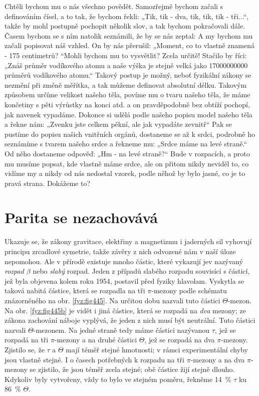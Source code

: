     Chtěli bychom mu o nás všechno povědět. Samozřejmě bychom začali s deﬁnováním čísel, a to tak,
    že bychom řekli: „Tik, tik - dva, tik, tik, tik - tři...“, takže by mohl postupně pochopit
    několik slov, a tak bychom pokračovali dále. Časem bychom se s ním natolik seznámili, že by se
    nás zeptal:  A my bychom mu začali popisovat náš vzhled.  On by nás přerušil: „Moment, co to vlastně znamená - 175 centimetrů?
    “Mohli bychom mu to vysvětlit? Zcela určitě! Stačilo by říci: „Znáš průměr vodíkového atomu a
    naše výška je stejně velká jako \num{17 000 000 000} průměrů vodíkového atomu.“ Takový postup je
    možný, neboť fyzikální zákony se nezmění při změně měřítka, a tak můžeme deﬁnovat absolutní
    délku. Takovým způsobem určíme velikost našeho těla, povíme mu o tvaru našeho těla, že máme
    končetiny s pěti výrůstky na konci atd. a on pravděpodobně bez obtíží pochopí, jak navenek
    vypadáme. Dokonce si udělá podle našeho popisu model našeho těla a řekne nám: „Zvenku jste
    celkem pěkní, ale jak vypadáte zevnitř“ Pak se pustíme do popisu našich vnitřních orgánů,
    dostaneme se až k srdci, podrobně ho seznámíme s tvarem našeho srdce a řekneme mu: „Srdce máme
    na levé straně.“ Od něho dostaneme odpověď: „Hm - na levé straně?“ Bude v rozpacích, a proto mu
    musíme popsat, kde vlastně máme srdce, ale on přitom nikdy neviděl to, co vidíme my a nikdy od
    nás nedostal vzorek, podle něhož by bylo jasné, co je to pravá strana. Dokážeme to?
  
  \section{Parita se nezachovává}\label{fyz:IchapLIIsecVII}
    Ukazuje se, že zákony gravitace, elektřiny a magnetizmu i jaderných sil vyhovují principu
    zrcadlové symetrie, takže závěry z nich odvozené nám v naší úloze nepomohou. Ale v přírodě
    existuje mnoho částic, které vykazují jev nazývaný \emph{rozpad \(\beta\)} nebo \emph{slabý}
    rozpad. Jeden z případů slabého rozpadu souvisící s částicí, jež byla objevena kolem roku 1954,
    postavil před fyziky hlavolam. Vyskytla se taková nabitá částice, která se rozpadla na tři
    \(\pi\)-mezony podle schématu znázorněného na obr. \ref{fyz:fig445}. Na určitou dobu nazvali
    tuto částici \(\varTheta\)-mezon. Na obr. \ref{fyz:fig445b} je vidět i jiná částice, která se
    rozpadá na \emph{dva} mezony; ze zákona zachování náboje vyplývá, že jeden z nich musí být
    neutrální. Tuto částici nazvali \(\varTheta\)-mezonem. Na jedné straně tedy máme částici
    nazývanou \(\tau\), jež se rozpadá na tři \(\pi\)-mezony a na druhé částici \(\varTheta\), jež
    se rozpadá na dva \(\pi\)-mezony. Zjistilo se, že \(\tau\) a \(\varTheta\) mají téměř stejné
    hmotnosti; v rámci experimentální chyby jsou vlastně stejné. I o časech potřebných k rozpadu na
    tři \(\pi\)-mezony a na dva \(\pi\)-mezony se zjistilo, že jsou téměř zcela stejné; obě částice
    žijí stejně dlouho. Kdykoliv byly vytvořeny, vždy to bylo ve stejném poměru, řekněme
    \SI{14}{\percent} \(\tau\) ku \SI{86}{\percent} \(\varTheta\).  
  
